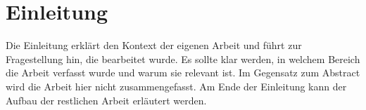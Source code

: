 \chapter{Einleitung}
Die Einleitung erklärt den Kontext der eigenen Arbeit und führt zur Fragestellung hin, die bearbeitet wurde. Es sollte klar werden, in welchem Bereich die Arbeit verfasst wurde und warum sie relevant ist. Im Gegensatz zum Abstract wird die Arbeit hier nicht zusammengefasst. Am Ende der Einleitung kann der Aufbau der restlichen Arbeit erläutert werden.
